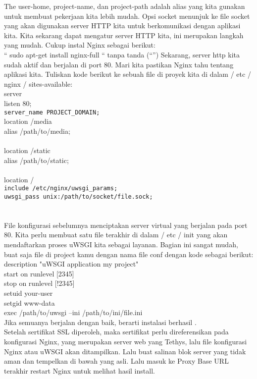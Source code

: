 \documentclass[12pt, times new roman, a4paper]{Article}
\begin{document}
The user-home, project-name, dan project-path adalah alias yang kita gunakan untuk membuat pekerjaan kita lebih mudah. Opsi socket menunjuk ke file socket yang akan digunakan server HTTP kita untuk berkomunikasi dengan aplikasi kita.
Kita sekarang dapat mengatur server HTTP kita, ini merupakan langkah yang mudah. Cukup instal Nginx sebagai berikut:\\
“ sudo apt-get install nginx-full “ tanpa tanda (“”)
Sekarang, server http kita sudah aktif dan berjalan di port 80. Mari kita pastikan Nginx tahu tentang aplikasi kita. Tuliskan kode berikut ke sebuah file di proyek kita di dalam / etc / nginx / sites-available:\\
server {\\
listen 80;\\
\verb|server_name PROJECT_DOMAIN;|\\
location /media {\\
alias /path/to/media;\\
}\\
location /static {\\
alias /path/to/static;\\
}\\
location / {\\
\verb|include /etc/nginx/uwsgi_params;|\\
\verb|uwsgi_pass unix:/path/to/socket/file.sock;|\\
}\\
}\\
File konfigurasi sebelumnya menciptakan server virtual yang berjalan pada port 80. Kita perlu membuat satu file terakhir di dalam / etc / init yang akan mendaftarkan proses uWSGI kita sebagai layanan. Bagian ini sangat mudah, buat saja file di project kamu dengan nama file conf dengan kode sebagai berikut:\\
description "uWSGI application my project"\\
start on runlevel [2345]\\
stop on runlevel [!2345]\\
setuid your-user\\
setgid www-data\\
exec /path/to/uwsgi --ini /path/to/ini/file.ini\\
Jika semuanya berjalan dengan baik, berarti instalasi berhasil \cite{maia2015building}.\\

Setelah sertifikat SSL diperoleh, maka sertifikat perlu direferensikan pada konfigurasi Nginx, yang merupakan server web yang Tethys, lalu file konfigurasi Nginx atau uWSGI akan ditampilkan. Lalu buat salinan blok server yang tidak aman dan tempelkan di bawah yang asli. Lalu masuk ke Proxy Base URL terakhir restart Nginx untuk melihat hasil install\cite{swain2018tethys}.
\end{document}
